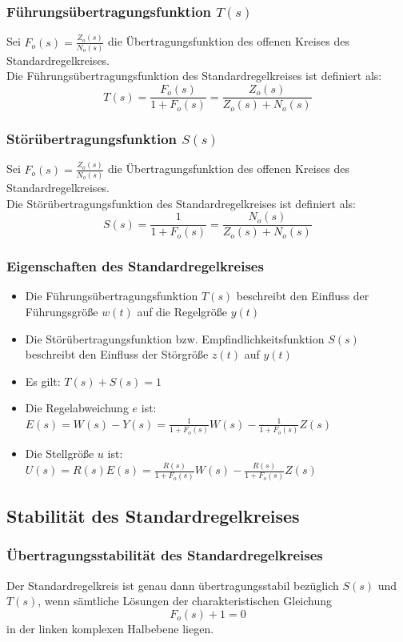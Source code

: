 \documentclass[10pt,a4paper]{article}
\begin{document}
\subsubsection{Führungsübertragungsfunktion $T(s)$}
Sei $F_o(s) = \frac{Z_o(s)}{N_o(s)}$ die Übertragungsfunktion des offenen Kreises des Standardregelkreises. \\
Die Führungsübertragungsfunktion des Standardregelkreises ist definiert als:
$$
	T(s) = \frac{F_o(s)}{1 + F_o(s)} = \frac{Z_o(s)}{Z_o(s) + N_o(s)}
$$

\subsubsection{Störübertragungsfunktion $S(s)$}
Sei $F_o(s) = \frac{Z_o(s)}{N_o(s)}$ die Übertragungsfunktion des offenen Kreises des Standardregelkreises. \\
Die Störübertragungsfunktion des Standardregelkreises ist definiert als:
$$
	S(s) = \frac{1}{1 + F_o(s)} = \frac{N_o(s)}{Z_o(s) + N_o(s)}
$$

\subsubsection{Eigenschaften des Standardregelkreises}
\begin{itemize}
	\item Die Führungsübertragungsfunktion $T(s)$ beschreibt den Einfluss der Führungsgröße $w(t)$ auf die Regelgröße $y(t)$
	\item Die Störübertragungsfunktion bzw. Empfindlichkeitsfunktion $S(s)$ beschreibt den Einfluss der Störgröße $z(t)$ auf $y(t)$
	\item Es gilt: $T(s) + S(s) = 1$
	\item Die Regelabweichung $e$ ist: $E(s) = W(s) - Y(s) = \frac{1}{1 + F_o(s)}W(s) - \frac{1}{1 + F_o(s)} Z(s)$
	\item Die Stellgröße $u$ ist: $U(s) = R(s)E(s) = \frac{R(s)}{1 + F_o(s)}W(s) - \frac{R(s)}{1 + F_o(s)} Z(s)$
\end{itemize}

\subsection{Stabilität des Standardregelkreises}
\subsubsection{Übertragungsstabilität des Standardregelkreises}
Der Standardregelkreis ist genau dann übertragungsstabil bezüglich $S(s)$ und $T(s)$, wenn sämtliche Lösungen der charakteristischen Gleichung 
$$
	F_o(s) + 1 = 0
$$
in der linken komplexen Halbebene liegen.
\end{document}
